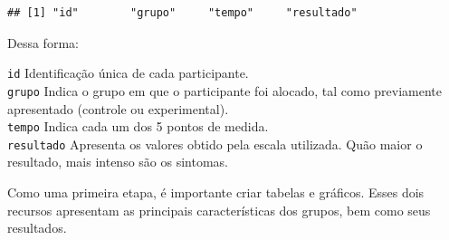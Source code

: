 \documentclass[
]{book}
\newenvironment{Shaded}{\begin{snugshade}}{\end{snugshade}}
\newcommand{\DataTypeTok}[1]{\textcolor[rgb]{0.13,0.29,0.53}{#1}}
\newcommand{\KeywordTok}[1]{\textcolor[rgb]{0.13,0.29,0.53}{\textbf{#1}}}
\newcommand{\NormalTok}[1]{#1}
\newcommand{\OperatorTok}[1]{\textcolor[rgb]{0.81,0.36,0.00}{\textbf{#1}}}
\newcommand{\OtherTok}[1]{\textcolor[rgb]{0.56,0.35,0.01}{#1}}
\newcommand{\StringTok}[1]{\textcolor[rgb]{0.31,0.60,0.02}{#1}}
\begin{document}
\begin{verbatim}
## [1] "id"        "grupo"     "tempo"     "resultado"
\end{verbatim}

Dessa forma:

\texttt{id} Identificação única de cada participante.\\
\texttt{grupo} Indica o grupo em que o participante foi alocado, tal como previamente apresentado (controle ou experimental).\\
\texttt{tempo} Indica cada um dos 5 pontos de medida.\\
\texttt{resultado} Apresenta os valores obtido pela escala utilizada. Quão maior o resultado, mais intenso são os sintomas.

Como uma primeira etapa, é importante criar tabelas e gráficos. Esses dois recursos apresentam as principais características dos grupos, bem como seus resultados.

\begin{Shaded}
\end{Shaded}
\end{document}
